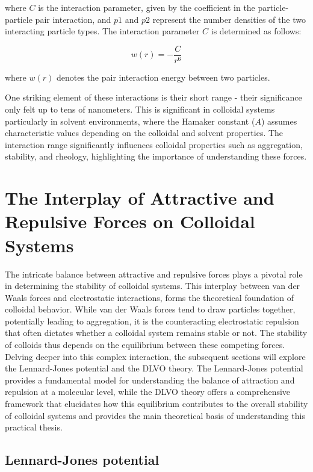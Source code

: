 where \(C\) is the interaction parameter, given by the coefficient in the particle-particle pair interaction, and \(p1\) and \(p2\) represent the number densities of the two interacting particle types. \cite{FoundColloidBook} The interaction parameter \(C\) is determined as follows:


\begin{equation}
w(r) = - \frac{C}{r^6}
\end{equation}

where \(w(r)\) denotes the pair interaction energy between two particles. 

One striking element of these interactions is their short range - their significance only felt up to tens of nanometers. This is significant in colloidal systems particularly in solvent environments, where the Hamaker constant (\(A\)) assumes characteristic values depending on the colloidal and solvent properties. The interaction range significantly influences colloidal properties such as aggregation, stability, and rheology, highlighting the importance of understanding these forces.\cite{?} %

\section{The Interplay of Attractive and Repulsive Forces on Colloidal Systems}

The intricate balance between attractive and repulsive forces plays a pivotal role in determining the stability of colloidal systems. This interplay between van der Waals forces and electrostatic interactions, forms the theoretical foundation of colloidal behavior. While van der Waals forces tend to draw particles together, potentially leading to aggregation, it is the counteracting electrostatic repulsion that often dictates whether a colloidal system remains stable or not. The stability of colloids thus depends on the equilibrium between these competing forces. Delving deeper into this complex interaction, the subsequent sections will explore the Lennard-Jones potential and the DLVO theory. The Lennard-Jones potential provides a fundamental model for understanding the balance of attraction and repulsion at a molecular level, while the DLVO theory offers a comprehensive framework that elucidates how this equilibrium contributes to the overall stability of colloidal systems and provides the main theoretical basis of understanding this practical thesis.

\subsection{Lennard-Jones potential} %

